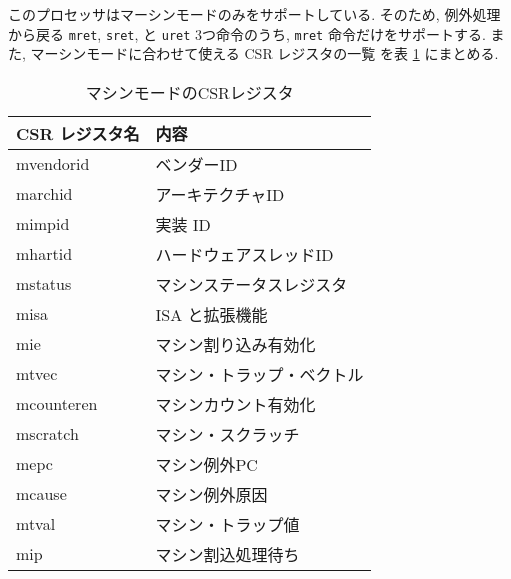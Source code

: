 \documentclass[../specifications.tex]{subfiles}
\begin{document}
  このプロセッサはマーシンモードのみをサポートしている.
  そのため, 例外処理から戻る \verb|mret|, \verb|sret|, と \verb|uret|
  3つ命令のうち, \verb|mret| 命令だけをサポートする.
  また, マーシンモードに合わせて使える CSR レジスタの一覧
  \cite{riscv-reader} \cite{riscv-priviledged}
  を表 \ref{table:csrs} にまとめる.

  \begin{table}[h]
    \begin{tabular}{|l|l|}
    \hline
    CSR レジスタ名 & 内容 \\ \hline
    mvendorid & ベンダーID \\
    marchid & アーキテクチャID \\
    mimpid & 実装 ID \\
    mhartid & ハードウェアスレッドID \\
    mstatus & マシンステータスレジスタ \\
    misa & ISA と拡張機能 \\
    mie & マシン割り込み有効化 \\
    mtvec & マシン・トラップ・ベクトル \\
    mcounteren & マシンカウント有効化 \\
    mscratch & マシン・スクラッチ \\
    mepc & マシン例外PC \\
    mcause & マシン例外原因 \\
    mtval & マシン・トラップ値 \\
    mip & マシン割込処理待ち \\ \hline
    \end{tabular}
    \caption{マシンモードのCSRレジスタ}
    \label{table:csrs}
  \end{table}
  
\end{document}
